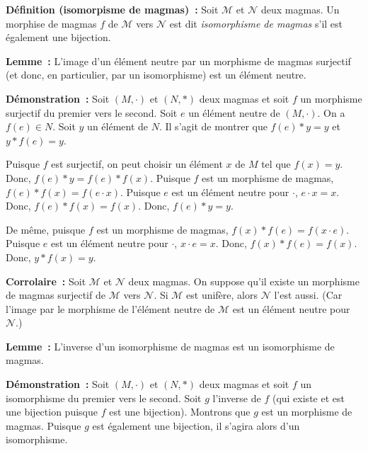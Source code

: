 \medskip

\noindent\textbf{Définition (isomorpisme de magmas) :} Soit $\mathcal{M}$ et $\mathcal{N}$ deux magmas.
    Un morphise de magmas $f$ de $\mathcal{M}$ vers $\mathcal{N}$ est dit \textit{isomorphisme de magmas} s'il est également une bijection.

\medskip

\noindent\textbf{Lemme :} L'image d'un élément neutre par un morphisme de magmas surjectif (et donc, en particulier, par un isomorphisme) est un élément neutre.

\medskip

\noindent\textbf{Démonstration :} Soit $\left(M, \cdot \right)$ et $\left(N, \ast \right)$ deux magmas et soit $f$ un morphisme surjectif du premier vers le second. 
    Soit $e$ un élément neutre de $\left(M, \cdot \right)$. 
    On a $f(e) \in N$. 
    Soit $y$ un élément de $N$. 
    Il s'agit de montrer que $f(e) \ast y = y$ et $y \ast f(e) = y$.

    Puisque $f$ est surjectif, on peut choisir un élément $x$ de $M$ tel que $f(x) = y$. 
    Donc, $f(e) \ast y = f(e) \ast f(x)$. 
    Puisque $f$ est un morphisme de magmas, $f(e) \ast f(x) = f(e \cdot x)$. 
    Puisque $e$ est un élément neutre pour $\cdot$, $e \cdot x = x$. 
    Donc, $f(e) \ast f(x) = f(x)$.
    Donc, $f(e) \ast y = y$. 

    De même, puisque $f$ est un morphisme de magmas, $f(x) \ast f(e) = f(x \cdot e)$. 
    Puisque $e$ est un élément neutre pour $\cdot$, $x \cdot e = x$. 
    Donc, $f(x) \ast f(e) = f(x)$.
    Donc, $y \ast f(x) = y$. 

    \hfill \square

\medskip

\noindent\textbf{Corrolaire :} Soit $\mathcal{M}$ et $\mathcal{N}$ deux magmas. 
    On suppose qu'il existe un morphisme de magmas surjectif de $\mathcal{M}$ vers $\mathcal{N}$. 
    Si $\mathcal{M}$ est unifère, alors $\mathcal{N}$ l'est aussi. 
    (Car l'image par le morphisme de l'élément neutre de $\mathcal{M}$ est un élément neutre pour $\mathcal{N}$.)

\medskip

\noindent\textbf{Lemme :} L'inverse d'un isomorphisme de magmas est un isomorphisme de magmas.

\medskip

\noindent\textbf{Démonstration :} Soit $\left(M, \cdot \right)$ et $\left(N, \ast \right)$ deux magmas et soit $f$ un isomorphisme du premier vers le second. 
    Soit $g$ l'inverse de $f$ (qui existe et est une bijection puisque $f$ est une bijection). 
    Montrons que $g$ est un morphisme de magmas. 
    Puisque $g$ est également une bijection, il s'agira alors d'un isomorphisme. 

